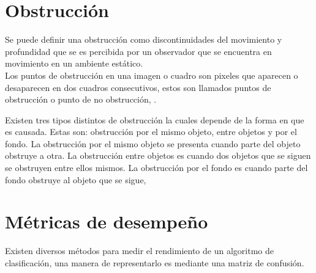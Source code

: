 \section{Obstrucción}\label{OclusionDef} 

Se puede definir una obstrucción como discontinuidades del movimiento y profundidad que se es percibida por un observador que se encuentra en movimiento en un ambiente estático.\\
Los puntos de obstrucción en una imagen o cuadro son pixeles que aparecen o desaparecen en dos cuadros consecutivos, estos son llamados puntos de obstrucción o punto de no obstrucción, \citep{Silva2001}.  

Existen tres tipos distintos de obstrucción la cuales depende de la forma en que es causada. Estas son: obstrucción por el mismo objeto, entre objetos y por el fondo. La obstrucción por el mismo objeto se presenta cuando parte del objeto obstruye a otra. La obstrucción entre objetos es cuando dos objetos que se siguen se obstruyen entre ellos mismos. La obstrucción por el fondo es cuando parte del fondo obstruye al objeto que se sigue, \citep{YilmazA.JavedO.andShah2006}




\section{Métricas de desempeño}\label{Metricas}

Existen diversos métodos para medir el rendimiento de un algoritmo de clasificación, una manera de representarlo es mediante una matriz de confusión. 

